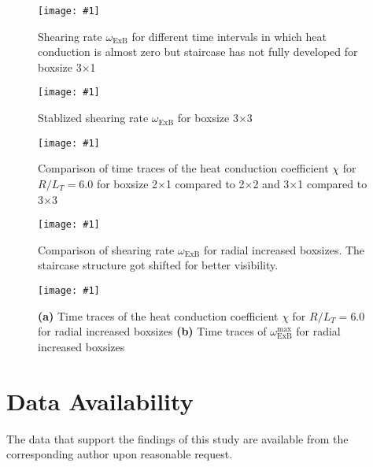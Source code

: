 \documentclass[aip, amsmath, amssymb, reprint, twocolumn]{revtex4-1}
\newcommand{\includegraphicsOneCol}[3]{
	\begin{figure}[h]
		\texttt{[image: \#1]}
		\caption{#2}
  	\end{figure}
	\label{#3}
  	\increasecounter{fig}{1}
}
\newcommand{\includegraphicsTwoCol}[3]{
	\begin{figure*}
    	\texttt{[image: \#1]}
		\caption{#2}
	\end{figure*}
	\label{#3}
	\increasecounter{fig}{2}
}
\begin{document}
\includegraphicsOneCol{S6_rlt6.0/boxsize3x1/Ns16/Nvpar48/Nmu9/S6_rlt6.0_boxsize3x1_Ns16_Nvpar48_Nmu9_wexb_selection.pdf}{
	Shearing rate $\omega_{\mathrm{ExB}}$ for different time intervals in which heat conduction is almost zero but staircase has not fully developed for boxsize 3$\times$1
}{fig:wexb-3x1-selection}

\includegraphicsOneCol{S6_rlt6.0/boxsize3x3/Ns16/Nvpar48/Nmu9/S6_rlt6.0_boxsize3x3_Ns16_Nvpar48_Nmu9_wexb_selection.pdf}{
	Stablized shearing rate $\omega_{\mathrm{ExB}}$ for boxsize 3$\times$3
}{fig:wexb-3x3-stable}

\includegraphicsTwoCol{Comparison/Boxsize/S6_rlt6.0_boxsize2x1-2-3x1-3_Ns16_Nvpar48_Nmu9_eflux_comparison.pdf}{
	Comparison of time traces of the heat conduction coefficient $\chi$ for $R/L_T = 6.0$ for boxsize 2$\times$1 compared to 2$\times$2 and 3$\times$1 compared to 3$\times$3
}{fig:eflux-2x1-2-3x1-3-comparison}

\includegraphicsTwoCol{Comparison/Boxsize/S6_rlt6.0_boxsize1-2-3-4x1_Ns16_Nvpar48_Nmu9_wexb_comparison.pdf}{
	Comparison of shearing rate $\omega_{\mathrm{ExB}}$ for radial increased boxsizes. The staircase structure got 
	shifted for better visibility.
}{fig:wexb-1-2-3-4x1-stable-comparison}

\includegraphicsTwoCol{Comparison/Boxsize/S6_rlt6.0_boxsize1-2-3-4x1_Ns16_Nvpar48_Nmu9_comparison.pdf}{
	\textbf{(a)} Time traces of the heat conduction coefficient $\chi$ for $R/L_T = 6.0$ for radial increased boxsizes \linebreak
	\textbf{(b)} Time traces of $\omega_{\mathrm{ExB}}^{\mathrm{max}}$ for radial increased boxsizes
}{fig:wexb-eflux-1-2-3-4x1-comparison}


\section*{Data Availability}
The data that support the findings of this study are available from the corresponding author upon reasonable request.


\wordcountmessage


\end{document}
